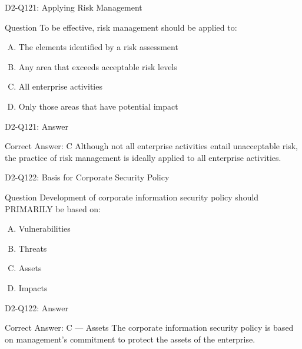 \documentclass{beamer}
\begin{document}
	\begin{frame}{D2-Q121: Applying Risk Management}
		\begin{block}{Question}
			To be effective, risk management should be applied to:
		\end{block}
		\begin{enumerate}[(A)]
			\item The elements identified by a risk assessment
			\item Any area that exceeds acceptable risk levels
			\item All enterprise activities
			\item Only those areas that have potential impact
		\end{enumerate}
	\end{frame}
	\begin{frame}{D2-Q121: Answer}
		\begin{block}{Correct Answer: C}
			Although not all enterprise activities entail unacceptable risk, the practice of risk management is ideally applied to all enterprise activities.
		\end{block}
	\end{frame}
	
	\begin{frame}{D2-Q122: Basis for Corporate Security Policy}
		\begin{block}{Question}
			Development of corporate information security policy should PRIMARILY be based on:
		\end{block}
		\begin{enumerate}[(A)]
			\item Vulnerabilities
			\item Threats
			\item Assets
			\item Impacts
		\end{enumerate}
	\end{frame}
	\begin{frame}{D2-Q122: Answer}
		\begin{block}{Correct Answer: C --- Assets}
			The corporate information security policy is based on management's commitment to protect the assets of the enterprise.
		\end{block}
	\end{frame}
	
\end{document}
